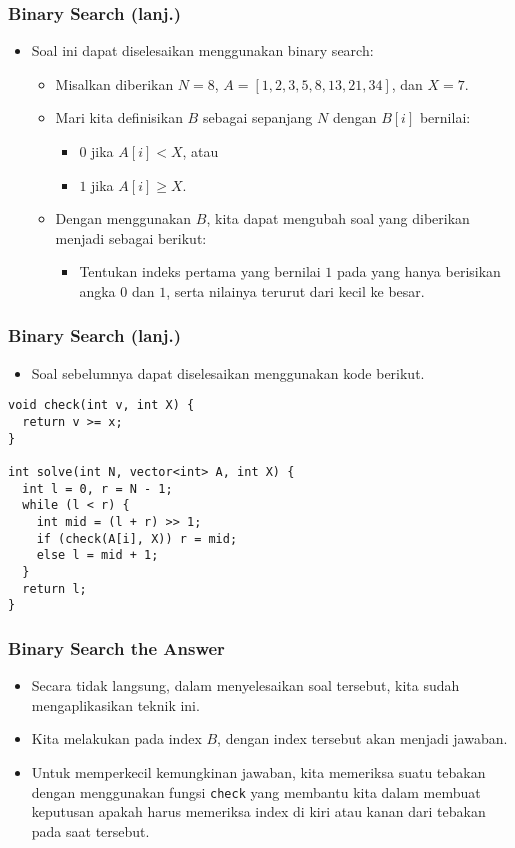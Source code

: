 \begin{frame}
\frametitle{Binary Search (lanj.)}
\begin{itemize}
  \item Soal ini dapat diselesaikan menggunakan binary search:
  \begin{itemize}
    \item Misalkan diberikan $N = 8$, $A = [1, 2, 3, 5, 8, 13, 21, 34]$, dan $X = 7$.
    \item Mari kita definisikan $B$ sebagai \farray sepanjang $N$ dengan $B[i]$ bernilai:
    \begin{itemize}
      \item $0$ jika $A[i] < X$, atau
      \item $1$ jika $A[i] \ge X$.
    \end{itemize}
    \item Dengan menggunakan \farray $B$, kita dapat mengubah soal yang diberikan menjadi sebagai berikut:
    \begin{itemize}
      \item Tentukan indeks pertama yang bernilai $1$ pada \farray yang hanya berisikan angka $0$ dan $1$, serta nilainya terurut dari kecil ke besar.
    \end{itemize}
  \end{itemize}
\end{itemize}
\end{frame}

\begin{frame}[fragile]
\frametitle{Binary Search (lanj.)}
\begin{itemize}
  \item Soal sebelumnya dapat diselesaikan menggunakan kode berikut.
\end{itemize}
\begin{lstlisting}
void check(int v, int X) {
  return v >= x;
}

int solve(int N, vector<int> A, int X) {
  int l = 0, r = N - 1;
  while (l < r) {
    int mid = (l + r) >> 1;
    if (check(A[i], X)) r = mid;
    else l = mid + 1;
  }
  return l;
}
\end{lstlisting}
\end{frame}

\begin{frame}
\frametitle{Binary Search the Answer}
\begin{itemize}
  \item Secara tidak langsung, dalam menyelesaikan soal tersebut, kita sudah mengaplikasikan teknik ini.
  \item Kita melakukan \fbinarySearch pada index \farray $B$, dengan index tersebut akan menjadi jawaban.
  \item Untuk memperkecil kemungkinan jawaban, kita memeriksa suatu tebakan dengan menggunakan fungsi \lstinline{check} yang membantu kita dalam membuat keputusan apakah harus memeriksa index di kiri atau kanan dari tebakan pada saat tersebut.
\end{itemize}
\end{frame}

